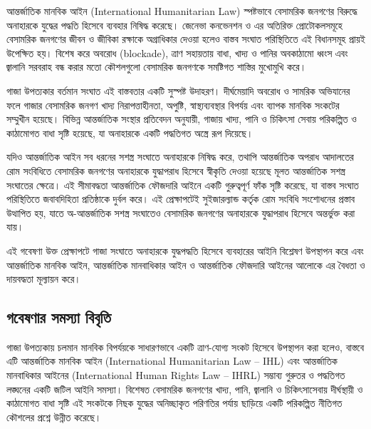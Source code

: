 আন্তর্জাতিক মানবিক আইন (International Humanitarian Law) স্পষ্টভাবে বেসামরিক জনগণের বিরুদ্ধে অনাহারকে যুদ্ধের পদ্ধতি হিসেবে ব্যবহার নিষিদ্ধ করেছে। জেনেভা কনভেনশন ও এর অতিরিক্ত প্রোটোকলসমূহে বেসামরিক জনগণের জীবন ও জীবিকা রক্ষাকে অগ্রাধিকার দেওয়া হলেও বাস্তব সংঘাত পরিস্থিতিতে এই বিধানসমূহ প্রায়ই উপেক্ষিত হয়। বিশেষ করে অবরোধ (blockade), ত্রাণ সহায়তায় বাধা, খাদ্য ও পানির অবকাঠামো ধ্বংস এবং জ্বালানি সরবরাহ বন্ধ করার মতো কৌশলগুলো বেসামরিক জনগণকে সমষ্টিগত শাস্তির মুখোমুখি করে।

গাজা উপত্যকার বর্তমান সংঘাত এই বাস্তবতার একটি সুস্পষ্ট উদাহরণ। দীর্ঘমেয়াদি অবরোধ ও সামরিক অভিযানের ফলে গাজার বেসামরিক জনগণ খাদ্য নিরাপত্তাহীনতা, অপুষ্টি, স্বাস্থ্যব্যবস্থার বিপর্যয় এবং ব্যাপক মানবিক সংকটের সম্মুখীন হয়েছে। বিভিন্ন আন্তর্জাতিক সংস্থার প্রতিবেদন অনুযায়ী, গাজায় খাদ্য, পানি ও চিকিৎসা সেবায় পরিকল্পিত ও কাঠামোগত বাধা সৃষ্টি হয়েছে, যা অনাহারকে একটি পদ্ধতিগত অস্ত্রে রূপ দিয়েছে।

যদিও আন্তর্জাতিক আইন সব ধরনের সশস্ত্র সংঘাতে অনাহারকে নিষিদ্ধ করে, তথাপি আন্তর্জাতিক অপরাধ আদালতের রোম সংবিধিতে বেসামরিক জনগণের অনাহারকে যুদ্ধাপরাধ হিসেবে স্বীকৃতি দেওয়া হয়েছে মূলত আন্তর্জাতিক সশস্ত্র সংঘাতের ক্ষেত্রে। এই সীমাবদ্ধতা আন্তর্জাতিক ফৌজদারি আইনে একটি গুরুত্বপূর্ণ ফাঁক সৃষ্টি করেছে, যা বাস্তব সংঘাত পরিস্থিতিতে জবাবদিহিতা প্রতিষ্ঠাকে দুর্বল করে। এই প্রেক্ষাপটেই সুইজারল্যান্ড কর্তৃক রোম সংবিধি সংশোধনের প্রস্তাব উত্থাপিত হয়, যাতে অ-আন্তর্জাতিক সশস্ত্র সংঘাতেও বেসামরিক জনগণের অনাহারকে যুদ্ধাপরাধ হিসেবে অন্তর্ভুক্ত করা যায়।

এই গবেষণা উক্ত প্রেক্ষাপটে গাজা সংঘাতে অনাহারকে যুদ্ধপদ্ধতি হিসেবে ব্যবহারের আইনি বিশ্লেষণ উপস্থাপন করে এবং আন্তর্জাতিক মানবিক আইন, আন্তর্জাতিক মানবাধিকার আইন ও আন্তর্জাতিক ফৌজদারি আইনের আলোকে এর বৈধতা ও দায়বদ্ধতা মূল্যায়ন করে।

\subsection{\texorpdfstring{গবেষণার সমস্যা বিবৃতি}{১.২ গবেষণার সমস্যা বিবৃতি}}\label{ux997ux9acux9b7ux9a3ux9b0-ux9b8ux9aeux9b8ux9af-ux9acux9acux9a4}

গাজা উপত্যকায় চলমান মানবিক বিপর্যয়কে সাধারণভাবে একটি ত্রাণ-যোগ্য সংকট হিসেবে উপস্থাপন করা হলেও, বাস্তবে এটি আন্তর্জাতিক মানবিক আইন (International Humanitarian Law -- IHL) এবং আন্তর্জাতিক মানবাধিকার আইনের (International Human Rights Law -- IHRL) সম্ভাব্য গুরুতর ও পদ্ধতিগত লঙ্ঘনের একটি জটিল আইনি সমস্যা। বিশেষত বেসামরিক জনগণের খাদ্য, পানি, জ্বালানি ও চিকিৎসাসেবায় দীর্ঘস্থায়ী ও কাঠামোগত বাধা সৃষ্টি এই সংকটকে নিছক যুদ্ধের অনিচ্ছাকৃত পরিণতির পর্যায় ছাড়িয়ে একটি পরিকল্পিত নীতিগত কৌশলের প্রশ্নে উন্নীত করেছে।

